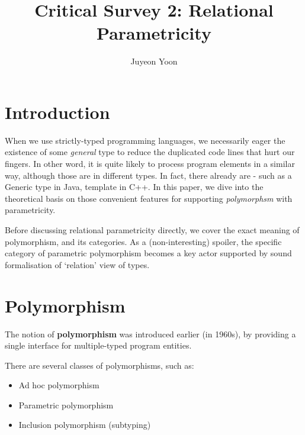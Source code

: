 \documentclass[sigconf]{acmart}
\begin{document}
\title{Critical Survey 2: Relational Parametricity}

\author{Juyeon Yoon}


\maketitle

\section{Introduction}
\label{sec:intro}

When we use strictly-typed programming languages, we necessarily eager the existence of some \textit{general} type to reduce the duplicated code lines that hurt our fingers. In other word, it is quite likely to process program elements in a similar way, although those are in different types. In fact, there already are - such as a Generic type in Java, template in C++. In this paper, we dive into the theoretical basis on those convenient features for supporting \textit{polymorphsm} with parametricity. 

Before discussing relational parametricity directly, we cover the exact meaning of polymorphism, and its categories. As a (non-interesting) spoiler, the specific category of parametric polymorphism becomes a key actor supported by sound formalisation of `relation' view of types. 

\section{Polymorphism}

The notion of \textbf{polymorphism} was introduced earlier (in 1960s), by providing a single interface for multiple-typed program entities. 

There are several classes of polymorphisms, such as:
\begin{itemize}
  \item Ad hoc polymorphism
  \item Parametric polymorphism
  \item Inclusion polymorphism (subtyping)
\end{itemize}

\end{document}
